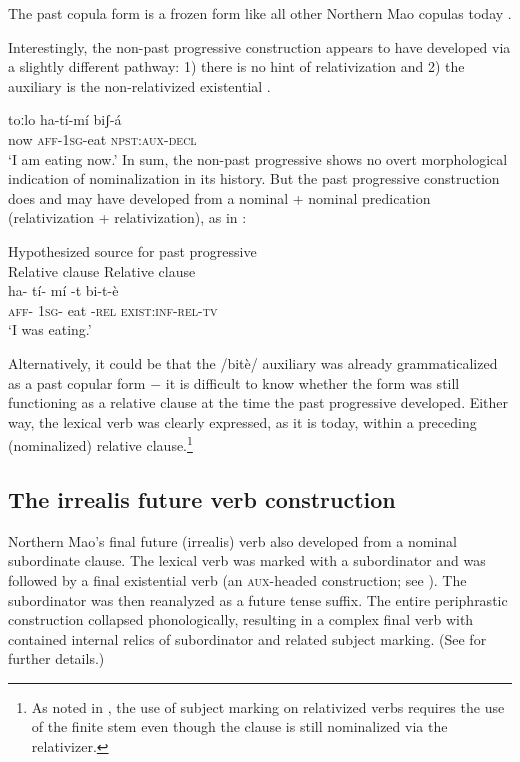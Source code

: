 \documentclass[output=paper]{langsci/langscibook}
\begin{document}
The past copula form is a frozen form like all other Northern Mao copulas today \citep[465]{Ahland2012}.

Interestingly, the non-past progressive construction appears to have developed via a slightly different pathway: 1) there is no hint of relativization and 2) the auxiliary is the non-relativized existential . 

\ea\label{ex:mahland:71}
\gll toːlo   ha-t\'{i}-m\'{i}         biʃ-\'{a}   \\
now   \textsc{aff-1sg}{}-eat    \textsc{npst:aux-decl} \\
\glt `I am eating now.'
\z
In sum, the non-past progressive shows no overt morphological indication of nominalization in its history. But the past progressive construction does and may have developed from a nominal + nominal predication (relativization + relativization), as in : 

\ea\label{ex:mahland:72}
Hypothesized source for past progressive\\
Relative clause      Relative clause \\
\gll ha-  t\'{i}-  m\'{i}  {}-t         bi-t-\`{e}\\
\textsc{aff-  1sg-  }eat    {}-\textsc{rel}     \textsc{exist:inf-rel-tv}\\
\glt `I was eating.'
\z

Alternatively, it could be that the /bit\`{e}/ auxiliary was already grammaticalized as a past copular form $-$ it is difficult to know whether the form was still functioning as a relative clause at the time the past progressive developed. Either way, the lexical verb was clearly expressed, as it is today, within a preceding (nominalized) relative clause.\footnote{As noted in , the use of subject marking on relativized verbs requires the use of the finite stem even though the clause is still nominalized via the relativizer.}

\subsection{The irrealis future verb construction}\label{sec:mahland:3.3}

Northern Mao's final future (irrealis) verb also developed from a nominal subordinate clause. The lexical verb was marked with a subordinator and was followed by a final existential verb (an \textsc{aux}{}-headed construction; see \citealt[39ff]{Anderson2006}). The subordinator was then reanalyzed as a future tense suffix. The entire periphrastic construction collapsed phonologically, resulting in a complex final verb with contained internal relics of subordinator and related subject marking. (See \citealt{Ahland2014b} for further details.) 
\end{document}
